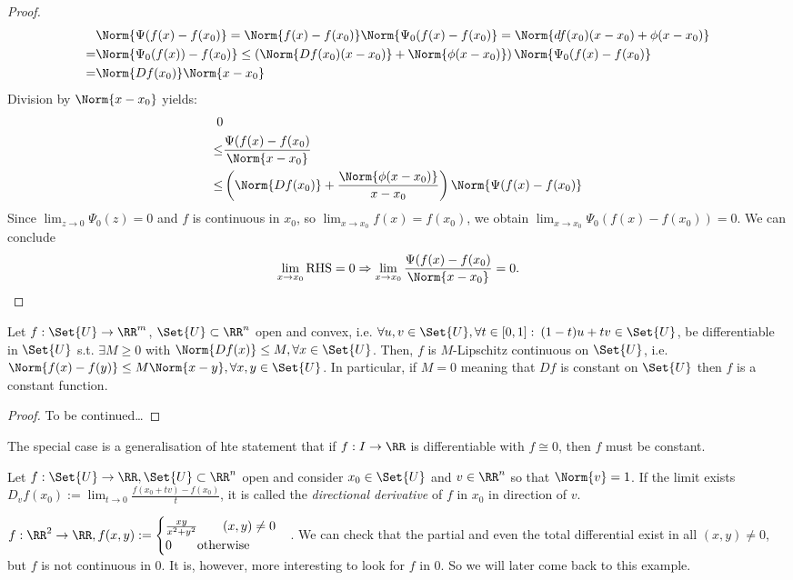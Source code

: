 \begin{proof}
\begin{align*}
  	&\Norm{\Psi(f(x)-f(x_0)}=\Norm{f(x)-f(x_0)}\Norm{\Psi_0(f(x)-f(x_0)}=\Norm{df(x_0)(x-x_0)+\phi(x-x_0)}\\
  	=&\Norm{\Psi_0(f(x))-f(x_0)}\leq\left(\Norm{Df(x_0)(x-x_0)}+\Norm{\phi(x-x_0)}\right)\Norm{\Psi_0(f(x)-f(x_0)}\\
  	=&\Norm{Df(x_0)}\Norm{x-x_0}
  \end{align*}
  Division by $\Norm{x-x_0}$ yields:
  \begin{align*}
  	0&\\\leq&\frac{\Psi(f(x)-f(x_0)}{\Norm{x-x_0}}\\
  	\leq&\left(\Norm{Df(x_0)}+\frac{\Norm{\phi(x-x_0)}}{x-x_0}\right)\Norm{\Psi(f(x)-f(x_0)}
  \end{align*}
  Since $\lim_{z\to 0}\Psi_0(z)=0$ and $f$ is continuous in $x_0$, so $\lim_{x\to x_0}f(x)=f(x_0)$, we obtain $\lim_{x\to x_0}\Psi_0(f(x)-f(x_0))=0$. We can conclude \[\lim_{x\to x_0}\text{RHS}=0\Rightarrow\lim_{x\to x_0}\frac{\Psi(f(x)-f(x_0)}{\Norm{x-x_0}}=0.\]
\end{proof}
\begin{prop}[Lipschitz continuity and $Df=0\Rightarrow f$ constant]
  Let $f:\Set{U}\to \RR^m$, $\Set{U}\subset\RR^n$ open and convex, i.e. $\forall u, v\in\Set{U}, \forall t\in[0,1]:\:(1-t)u+tv\in\Set{U}$, be differentiable in $\Set{U}$ s.t. $\exists M\geq 0$ with $\Norm{Df(x)}\leq M, \forall x\in\Set{U}$. Then, $f$ is $M$-Lipschitz continuous on $\Set{U}$, i.e. $\Norm{f(x)-f(y)}\leq M\Norm{x-y}, \forall x, y\in\Set{U}$. In particular, if $M=0$ meaning that $Df$ is constant on $\Set{U}$ then $f$ is a constant function.
\end{prop}
\begin{proof}
  To be continued\ldots
\end{proof}
\begin{rem}
  The special case is a generalisation of hte statement that if $f:I\to \RR$ is differentiable with $f\cong 0$, then $f$ must be constant. 
\end{rem}
\begin{defn}
  Let $f:\Set{U}\to\RR, \Set{U}\subset\RR^n$ open and consider $x_0\in\Set{U}$ and $v\in\RR^n$ so that $\Norm{v}=1$. If the limit exists $D_vf(x_0):=\lim_{t\to 0}\frac{f(x_0+tv)-f(x_0)}{t}$, it is called the \emph{directional derivative} of $f$ in $x_0$ in direction of $v$. 
\end{defn}
\begin{exam}
  $f:\RR^2\to \RR, f(x,y):=\begin{cases}
  \frac{xy}{x^2+y^2}\qquad (x,y)\neq 0\\0\qquad\text{otherwise}\end{cases}$. We can check that the partial and even the total differential exist in all $(x,y)\neq 0$, but $f$ is not continuous in $0$. It is, however, more interesting to look for $f$ in $0$. So we will later come back to this example. 
\end{exam}
